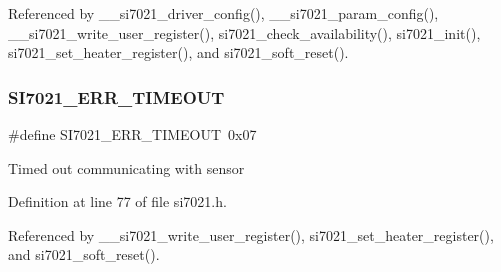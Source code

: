Referenced by \+\_\+\+\_\+si7021\+\_\+driver\+\_\+config(), \+\_\+\+\_\+si7021\+\_\+param\+\_\+config(), \+\_\+\+\_\+si7021\+\_\+write\+\_\+user\+\_\+register(), si7021\+\_\+check\+\_\+availability(), si7021\+\_\+init(), si7021\+\_\+set\+\_\+heater\+\_\+register(), and si7021\+\_\+soft\+\_\+reset().

\mbox{\label{group__SI7021__RT__VALUE_gaf3c553ace8f63aa562e2263c47a1b5ed}} 
\subsubsection{\texorpdfstring{S\+I7021\+\_\+\+E\+R\+R\+\_\+\+T\+I\+M\+E\+O\+UT}{SI7021\_ERR\_TIMEOUT}}
{\footnotesize\ttfamily \#define S\+I7021\+\_\+\+E\+R\+R\+\_\+\+T\+I\+M\+E\+O\+UT~0x07}

Timed out communicating with sensor 

Definition at line 77 of file si7021.\+h.



Referenced by \+\_\+\+\_\+si7021\+\_\+write\+\_\+user\+\_\+register(), si7021\+\_\+set\+\_\+heater\+\_\+register(), and si7021\+\_\+soft\+\_\+reset().

